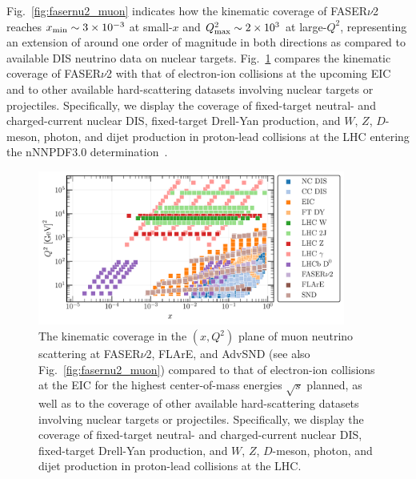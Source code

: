 Fig.~\ref{fig:fasernu2_muon} indicates
how the kinematic coverage of FASER$\nu$2 reaches
$x_{\rm min}\sim 3\times 10^{-3}$ at small-$x$ and $Q^2_{\rm max}\sim 2\times 10^3$
at large-$Q^2$, representing an extension
of around one order of magnitude in both directions as compared to available
DIS neutrino data on nuclear targets.
%
Fig.~\ref{fig:Kin_nNNPDF30_EIC_FPF} compares
the kinematic coverage of FASER$\nu$2 with that of electron-ion collisions
at the upcoming EIC~\cite{Khalek:2021ulf,AbdulKhalek:2021gbh}
and to other available hard-scattering datasets involving
nuclear targets or projectiles.
%
Specifically, we display the coverage of fixed-target neutral- and charged-current nuclear DIS,
fixed-target Drell-Yan production, and $W$, $Z$, $D$-meson, photon, and dijet
production in proton-lead collisions at the LHC entering the  nNNPDF3.0
determination~\cite{AbdulKhalek:2022fyi}.

\begin{figure}[t]
    \centering
    \includegraphics[width = 0.9\textwidth]{plots/Kin_nNNPDF30_EIC_FPF.pdf}
    \caption{The kinematic coverage in the $(x,Q^2)$ plane
      of muon neutrino scattering
      at FASER$\nu$2, FLArE,
      and AdvSND (see also Fig.~\ref{fig:fasernu2_muon})
      compared to that of electron-ion collisions
      at the EIC for the highest center-of-mass energies $\sqrt{s}$ planned,
      as well as to the coverage of other available hard-scattering datasets involving
      nuclear targets or projectiles.
      Specifically, we display the coverage of fixed-target neutral- and charged-current nuclear DIS,
      fixed-target Drell-Yan production, and $W$, $Z$, $D$-meson, photon, and dijet
      production in proton-lead collisions at the LHC.
      }
    \label{fig:Kin_nNNPDF30_EIC_FPF}
\end{figure}


